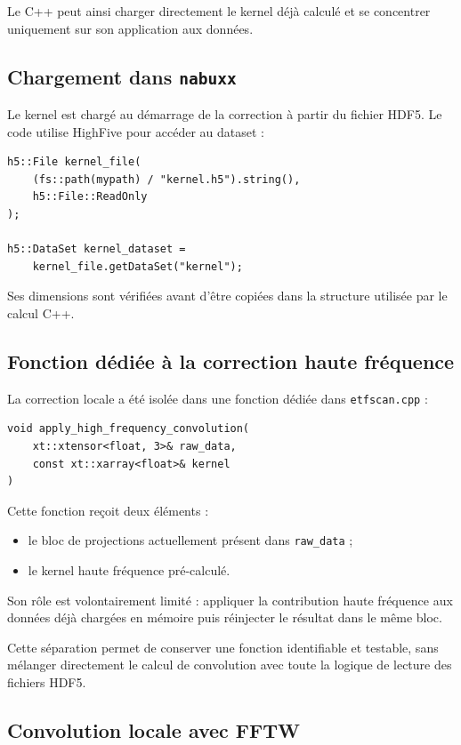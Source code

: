 \documentclass[11pt,a4paper]{report}
\begin{document}
Le C++ peut ainsi charger directement le kernel déjà calculé et se
concentrer uniquement sur son application aux données.

\subsection{Chargement dans \texttt{nabuxx}}

Le kernel est chargé au démarrage de la correction à partir du fichier
HDF5. Le code utilise HighFive pour accéder au dataset :

\begin{verbatim}
h5::File kernel_file(
    (fs::path(mypath) / "kernel.h5").string(),
    h5::File::ReadOnly
);

h5::DataSet kernel_dataset =
    kernel_file.getDataSet("kernel");
\end{verbatim}

Ses dimensions sont vérifiées avant d'être copiées dans la structure
utilisée par le calcul C++.


\subsection{Fonction dédiée à la correction haute fréquence}

La correction locale a été isolée dans une fonction dédiée dans
\texttt{etfscan.cpp} :

\begin{verbatim}
void apply_high_frequency_convolution(
    xt::xtensor<float, 3>& raw_data,
    const xt::xarray<float>& kernel
)
\end{verbatim}

Cette fonction reçoit deux éléments :

\begin{itemize}
    \item le bloc de projections actuellement présent dans
    \texttt{raw\_data} ;
    \item le kernel haute fréquence pré-calculé.
\end{itemize}

Son rôle est volontairement limité : appliquer la contribution haute
fréquence aux données déjà chargées en mémoire puis réinjecter le résultat
dans le même bloc.

Cette séparation permet de conserver une fonction identifiable et testable,
sans mélanger directement le calcul de convolution avec toute la logique de
lecture des fichiers HDF5.


\subsection{Convolution locale avec FFTW}
\end{document}
